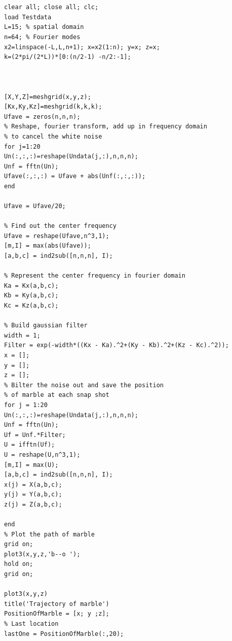 \documentclass[12pt,letterpaper]{article}
\begin{document}
\section{}


\begin{lstlisting}
clear all; close all; clc;
load Testdata
L=15; % spatial domain
n=64; % Fourier modes
x2=linspace(-L,L,n+1); x=x2(1:n); y=x; z=x;
k=(2*pi/(2*L))*[0:(n/2-1) -n/2:-1]; 



[X,Y,Z]=meshgrid(x,y,z);
[Kx,Ky,Kz]=meshgrid(k,k,k);
Ufave = zeros(n,n,n);
% Reshape, fourier transform, add up in frequency domain 
% to cancel the white noise
for j=1:20
Un(:,:,:)=reshape(Undata(j,:),n,n,n);
Unf = fftn(Un);
Ufave(:,:,:) = Ufave + abs(Unf(:,:,:));
end

Ufave = Ufave/20;

% Find out the center frequency
Ufave = reshape(Ufave,n^3,1);
[m,I] = max(abs(Ufave));
[a,b,c] = ind2sub([n,n,n], I);

% Represent the center frequency in fourier domain
Ka = Kx(a,b,c);
Kb = Ky(a,b,c);
Kc = Kz(a,b,c);

% Build gaussian filter
width = 1;
Filter = exp(-width*((Kx - Ka).^2+(Ky - Kb).^2+(Kz - Kc).^2));
x = [];
y = [];
z = [];
% Bilter the noise out and save the position
% of marble at each snap shot
for j = 1:20
Un(:,:,:)=reshape(Undata(j,:),n,n,n);
Unf = fftn(Un);
Uf = Unf.*Filter;
U = ifftn(Uf);
U = reshape(U,n^3,1);
[m,I] = max(U);
[a,b,c] = ind2sub([n,n,n], I);
x(j) = X(a,b,c);
y(j) = Y(a,b,c);
z(j) = Z(a,b,c);

end
% Plot the path of marble
grid on;
plot3(x,y,z,'b--o ');
hold on;
grid on;

plot3(x,y,z)
title('Trajectory of marble')
PositionOfMarble = [x; y ;z];
% Last location
lastOne = PositionOfMarble(:,20);
\end{lstlisting}
\end{document}
